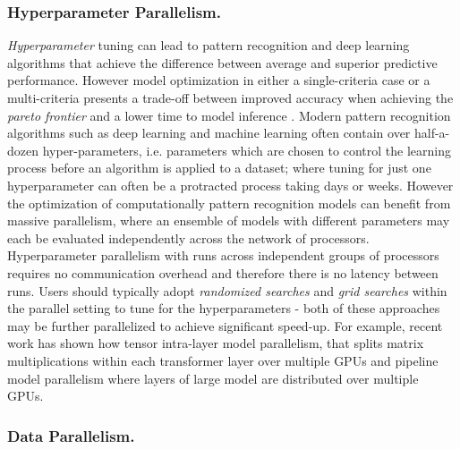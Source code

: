 \documentclass[10pt]{article}[draft]
\begin{document}
 \subsubsection{Hyperparameter Parallelism.}
 
 \emph{Hyperparameter} tuning can lead to pattern recognition  and deep learning algorithms that achieve the difference between average and superior predictive performance. However model optimization in either a single-criteria case or a multi-criteria presents a trade-off between improved accuracy when achieving the \emph{pareto frontier} and a lower time to model inference \cite{https://developer.nvidia.com/blog/sigopt-deep-learning-hyperparameter-optimization/}.  Modern pattern recognition algorithms such as deep learning and machine learning often contain over half-a-dozen {hyper-parameters}, i.e. parameters which are chosen to control the learning process before an algorithm is applied to a dataset; where tuning for just one hyperparameter can often be a protracted process taking days or weeks. However the optimization of computationally  pattern recognition models can benefit from  massive parallelism, where an ensemble of models with different parameters may each be evaluated independently across the network of processors. Hyperparameter parallelism with runs across independent groups of processors requires no communication overhead and therefore there is no latency between runs. Users should typically adopt \emph{randomized searches} and \emph{grid searches} within the parallel setting to tune for the hyperparameters - both of these approaches may be further parallelized to achieve significant speed-up.  For example, recent work has shown how tensor intra-layer model parallelism, that splits matrix multiplications within each transformer layer over multiple GPUs and pipeline model parallelism where layers of large model are distributed over multiple GPUs. 
 
  \subsubsection{Data Parallelism.}
  
\end{document}
